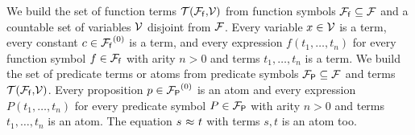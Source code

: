 
\begin{definition}
	We build the set of function {\myem terms} ${{\mathcal T}({{\mathcal F}_{\mathsf f}},\!{\mathcal V})}$ 
	from function symbols ${{\mathcal F}_{\mathsf f}} \subseteq {\mathcal F}$ and 
	a countable set of {\myem variables} ${\mathcal V}$ disjoint from ${\mathcal F}$.
	Every variable $x\in{\mathcal V}$ is a term,
	every constant $c\in{{\mathcal F}_{\mathsf f}}^{(0)}$ is a term, 
	and every expression $f(t_1,\ldots,t_n)$
	for every function symbol $f\in{{\mathcal F}_{\mathsf f}}$ 
	with arity $n>0$ 
	and terms $t_1,\ldots,t_n$
	is a term.
%	
	We build the set of predicate terms or {\myem atoms}
	from predicate symbols ${{\mathcal F}_{\mathsf P}} \subseteq {\mathcal F}$ and terms ${{\mathcal T}({{\mathcal F}_{\mathsf f}},\!{\mathcal V})}$. 
	Every proposition $p\in{{\mathcal F}_{\mathsf P}}^{(0)}$ is an atom 
	and every expression $P(t_1,\ldots,t_n)$
	for every predicate symbol $P\in{{\mathcal F}_{\mathsf P}}$ with arity $n>0$ and terms $t_1,\ldots,t_n$ is an atom.
	The equation $s\ {\mathsf \approx}\ t$ with terms $s,t$ is an atom too.
\end{definition}

